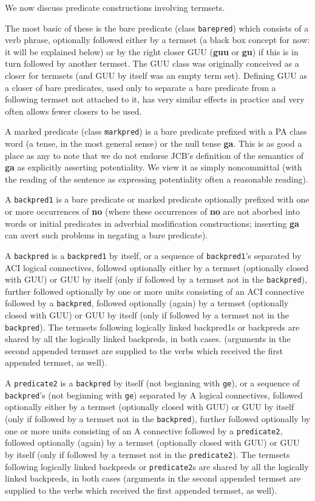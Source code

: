 \documentclass[12pt]{book}
\begin{document}
We now discuss predicate constructions involving termsets.

The most basic of these is the bare predicate (class {\tt barepred}) which consists of a verb phrase, optionally  followed either by a termset (a black box concept for now:  it will be explained below) or by the right closer GUU ({\bf guu} or {\bf gu}) if this is in turn followed by another termset.  The GUU class was originally conceived as a closer for termsets (and GUU by itself was an empty term set).  Defining GUU as a closer of bare predicates, used only to separate
a bare predicate from a following termset not attached to it, has very similar effects in practice and very often allows fewer closers to be used.

A marked predicate (class {\tt markpred}) is a bare predicate prefixed with a PA class word (a tense, in the most general sense) or the null tense {\bf ga}.
This is as good a place as any to note that we do not endorse JCB's definition of the semantics of {\bf ga} as explicitly asserting potentiality.  We view it as simply noncommittal (with the reading of the sentence as expressing potentiality often a reasonable reading).

A {\tt backpred1} is a bare predicate or marked predicate optionally prefixed with one or more occurrences of {\bf no} (where these occurrences of {\bf no} are not aborbed into words or initial predicates in adverbial modification constructions;  inserting {\bf ga} can avert such problems in negating a bare predicate).

A {\tt backpred} is a {\tt backpred1} by itself, or a sequence of {\tt backpred1}'s separated by ACI logical connectives, followed optionally either
by a termset (optionally closed with GUU) or GUU by itself (only if followed by a termset not in the {\tt backpred}), further followed optionally by one or more units consisting of an ACI connective followed by a {\tt backpred}, followed optionally (again) by a termset (optionally closed with GUU) or GUU by itself (only if followed by a termset not in the {\tt backpred}).  The termsets following logically linked backpred1s or backpreds are shared by all the logically linked backpreds, in both cases.   (arguments in the second appended termset are supplied to the verbs which received the first appended termset, as well).

A {\tt predicate2} is a {\tt backpred} by itself (not beginning with {\tt ge}), or a sequence of {\tt backpred}'s (not beginning with {\tt ge}) separated by A logical connectives, followed optionally either
by a termset (optionally closed with GUU) or GUU by itself (only if followed by a termset not in the {\tt backpred}), further followed optionally by one or more units consisting of an A connective followed by a {\tt predicate2}, followed optionally (again) by a termset (optionally closed with GUU) or GUU by itself (only if followed by a termset not in the {\tt predicate2}).  The termsets following logically linked backpreds or {\tt predicate2}s are shared by all the logically linked backpreds, in both cases (arguments in the second appended termset are supplied to the verbs which received the first appended termset, as well).
\end{document}
